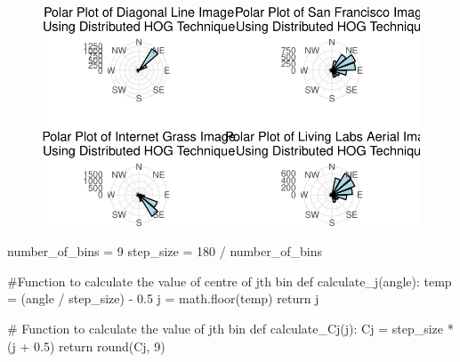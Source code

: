 \documentclass[
  letterpaper,
]{report}
\newenvironment{Shaded}{\begin{snugshade}}{\end{snugshade}}
\newcommand{\BuiltInTok}[1]{\textcolor[rgb]{0.00,0.23,0.31}{#1}}
\newcommand{\CommentTok}[1]{\textcolor[rgb]{0.37,0.37,0.37}{#1}}
\newcommand{\ControlFlowTok}[1]{\textcolor[rgb]{0.00,0.23,0.31}{#1}}
\newcommand{\DecValTok}[1]{\textcolor[rgb]{0.68,0.00,0.00}{#1}}
\newcommand{\FloatTok}[1]{\textcolor[rgb]{0.68,0.00,0.00}{#1}}
\newcommand{\KeywordTok}[1]{\textcolor[rgb]{0.00,0.23,0.31}{#1}}
\newcommand{\NormalTok}[1]{\textcolor[rgb]{0.00,0.23,0.31}{#1}}
\newcommand{\OperatorTok}[1]{\textcolor[rgb]{0.37,0.37,0.37}{#1}}
\begin{document}
\begin{figure}[H]

{\centering \includegraphics{results_files/figure-pdf/unnamed-chunk-23-1.pdf}

}

\end{figure}

\begin{Shaded}
\begin{Highlighting}[]
\NormalTok{number\_of\_bins }\OperatorTok{=} \DecValTok{9}
\NormalTok{step\_size }\OperatorTok{=} \DecValTok{180} \OperatorTok{/}\NormalTok{ number\_of\_bins}
\end{Highlighting}
\end{Shaded}

\begin{Shaded}
\begin{Highlighting}[]
\CommentTok{\#Function to calculate the value of centre of jth bin}
\KeywordTok{def}\NormalTok{ calculate\_j(angle):}
\NormalTok{  temp }\OperatorTok{=}\NormalTok{ (angle }\OperatorTok{/}\NormalTok{ step\_size) }\OperatorTok{{-}} \FloatTok{0.5}
\NormalTok{  j }\OperatorTok{=}\NormalTok{ math.floor(temp)}
  \ControlFlowTok{return}\NormalTok{ j}
\end{Highlighting}
\end{Shaded}

\begin{Shaded}
\begin{Highlighting}[]
\CommentTok{\# Function to calculate the value of jth bin}
\KeywordTok{def}\NormalTok{ calculate\_Cj(j):}
\NormalTok{  Cj }\OperatorTok{=}\NormalTok{ step\_size }\OperatorTok{*}\NormalTok{ (j }\OperatorTok{+} \FloatTok{0.5}\NormalTok{)}
  \ControlFlowTok{return} \BuiltInTok{round}\NormalTok{(Cj, }\DecValTok{9}\NormalTok{)}
\end{Highlighting}
\end{Shaded}
\end{document}
